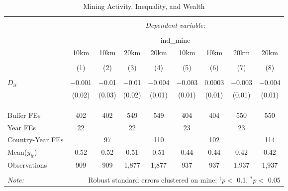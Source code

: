 
\begin{table}[ht!] \centering 
  \caption{Mining Activity, Inequality, and Wealth} 
  \label{tab:did_dhs_inequality} 
\begin{tabular}{@{\extracolsep{0pt}}lcccccccc} 
\\[-1.8ex]\hline 
\hline \\[-1.8ex] 
 & \multicolumn{8}{c}{\textit{Dependent variable:}} \\ 
\cline{2-9} 
\\[-1.8ex] & \multicolumn{8}{c}{ind\_mine} \\ 
 & 10km & 10km & 20km & 20km & 10km & 10km & 20km & 20km \\ 
\\[-1.8ex] & (1) & (2) & (3) & (4) & (5) & (6) & (7) & (8)\\ 
\hline \\[-1.8ex] 
 $D_{it}$ & $-$0.001 & $-$0.01 & $-$0.01 & $-$0.004 & $-$0.003 & 0.0003 & $-$0.003 & $-$0.004 \\ 
  & (0.02) & (0.03) & (0.02) & (0.01) & (0.01) & (0.01) & (0.01) & (0.01) \\ 
  & & & & & & & & \\ 
\hline \\[-1.8ex] 
\hline \\[-1.8ex] Buffer FEs & 402 & 402 & 549 & 549 & 404 & 404 & 550 & 550 \\ 
Year FEs & 22 &  & 22 &  & 23 &  & 23 &  \\ 
Country-Year FEs &  & 97 &  & 110 &  & 102 &  & 114 \\ 
Mean($y_{it}$) & 0.52 & 0.52 & 0.51 & 0.51 & 0.44 & 0.44 & 0.42 & 0.42 \\ 
Observations & 909 & 909 & 1,877 & 1,877 & 937 & 937 & 1,937 & 1,937 \\ 
\hline 
\hline \\[-1.8ex] 
\textit{Note:}  & \multicolumn{8}{r}{Robust standard errors clustered on mine; $^{\dagger} p <$ 0.1, $^*p <$ 0.05} \\ 
\end{tabular} 
\end{table} 
